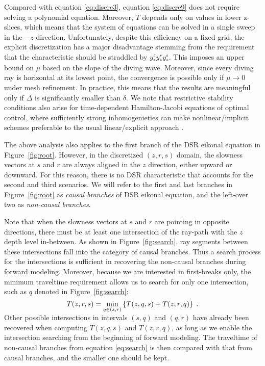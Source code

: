 Compared with equation \ref{eq:discre3}, equation \ref{eq:discre9} does not 
require solving a polynomial equation. Moreover, $T$ depends only on 
values in lower z-slices, which means that the system of equations can be solved in a single sweep in the $-z$ 
direction. Unfortunately, despite this efficiency on a fixed grid, the explicit discretization has a major 
disadvantage stemming from the requirement that the characteristic should be straddled by $y^z_* y^r_* y^s_*$. 
This imposes an upper bound on $\mu$ based on the slope of the diving wave. Moreover, since every diving ray is 
horizontal at its lowest point, the convergence is possible only if $\mu \to 0$ under mesh refinement. In 
practice, this means that the results are meaningful only if $\Delta$ is significantly smaller than $\delta$. We 
note that restrictive stability conditions also arise for time-dependent Hamilton-Jacobi equations of optimal 
control, where sufficiently strong inhomogenieties can make nonlinear/implicit schemes preferable to the usual 
linear/explicit approach \cite[]{vladimirsky}.

The above analysis also applies to the first branch of the DSR eikonal equation in Figure~\ref{fig:root}. 
However, in the discretized $(z,r,s)$ domain, the slowness vectors at $s$ and $r$ are always 
aligned in the $z$ direction, either upward or downward. For this reason, there is no DSR characteristic that 
accounts for the second and third scenarios. We will refer to the first and last branches in 
Figure~\ref{fig:root} as \textit{causal branches} of DSR eikonal equation, and the left-over two as 
\textit{non-causal branches}.

Note that when the slowness vectors at $s$ and $r$ are pointing in opposite directions, there must be at least 
one intersection of the ray-path with the $z$ depth level in-between. As shown in Figure~\ref{fig:search}, ray 
segments between these intersections fall into the category of causal branches. Thus a search process for the 
intersections is sufficient in recovering the non-causal branches during forward modeling. Moreover, because we 
are interested in first-breaks only, the minimum traveltime requirement allows us to search for only one 
intersection, such as $q$ denoted in Figure~\ref{fig:search}: 
\begin{equation}
\label{eq:search}
T (z,r,s) = \smash{\displaystyle\min_{q \in (s,r)}}
\left\{ T (z,q,s) + T (z,r,q) \right\}\;.
\end{equation}
Other possible intersections in intervals $(s,q)$ and $(q,r)$ have already been recovered when computing 
$T (z,q,s)$ and $T (z,r,q)$, as long as we enable the intersection searching from the beginning of forward 
modeling. The traveltime of non-causal branches from equation \ref{eq:search} is then compared with that from 
causal branches, and the smaller one should be kept. 

